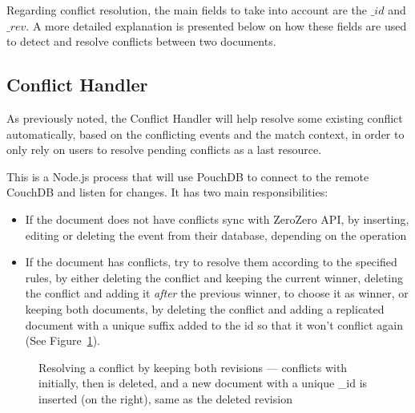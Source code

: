 Regarding conflict resolution, the main fields to take into account are the $\_id$ and $\_rev$. A more detailed explanation is presented below on how these fields are used to detect and resolve conflicts between two documents.

\subsection{Conflict Handler}

As previously noted, the Conflict Handler will help resolve some existing conflict automatically, based on the conflicting events and the match context, in order to only rely on users to resolve pending conflicts as a last resource.

This is a Node.js process that will use PouchDB to connect to the remote CouchDB and listen for changes. It has two main responsibilities:
\begin{itemize}
    \item If the document does not have conflicts sync with ZeroZero API, by inserting, editing or deleting the event from their database, depending on the operation
    \item If the document has conflicts, try to resolve them according to the specified rules, by either deleting the conflict and keeping the current winner, deleting the conflict and adding it \textit{after} the previous winner, to choose it as winner, or keeping both documents, by deleting the conflict and adding a replicated document with a unique suffix added to the id so that it won't conflict again (See Figure~\ref{graph:keep-both-resolution}).
\end{itemize}

\begin{figure}[h]
    \centering
  \caption[Resolving a conflict by keeping both revisions]{Resolving a conflict by keeping both revisions ---  conflicts with  initially, then  is deleted, and a new document with a unique \_id is inserted (on the right), same as the deleted revision }
  \label{graph:keep-both-resolution}
  \end{figure}


